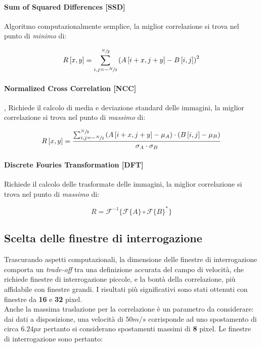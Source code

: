 \documentclass[a4paper]{article}
\begin{document}
\paragraph{Sum of Squared Differences [SSD]} Algoritmo computazionalmente semplice, la miglior correlazione si trova nel punto di \textit{minimo} di:

\begin{equation}
R\left[x,y \right] = \sum_{i,j=-\sfrac{N}{2}}^{\sfrac{N}{2}} \left( A\left[i+x,j+y\right] - B\left[i,j \right] \right)^2
\label{eq:ssd}
\end{equation}

\paragraph{Normalized Cross Correlation [NCC]}\cite{imcorr},\cite{ncc}  Richiede il calcolo di media e deviazione standard delle immagini, la miglior correlazione si trova nel punto di \textit{massimo} di:

\begin{equation}
R\left[x,y \right] = \frac{ \sum_{i,j=-\sfrac{N}{2}}^{\sfrac{N}{2}} \left( A\left[i+x,j+y\right] - \mu_A \right) \cdot \left( B\left[i,j \right] - \mu_B \right) } { \sigma_A \cdot \sigma_B }
\label{eq:ncc}
\end{equation}


\paragraph{Discrete Fouries Transformation [DFT]} Richiede il calcolo delle trasformate delle immagini, la miglior correlazione si trova nel punto di \textit{massimo} di:

\begin{equation}
R = \mathscr{F}^{-1} \{ \mathscr{F}\{A\} \circ \mathscr{F}\{B\}^*    \}
\label{eq:dft}
\end{equation}

\subsection{Scelta delle finestre di interrogazione}

Trascurando aspetti computazionali, la dimensione delle finestre di interrogazione comporta un \textit{trade-off} tra una definizione accurata del campo di velocità, che richiede finestre di interrogazione piccole, e la bontà della correlazione, più affidabile con finestre grandi. I risultati più significativi sono stati ottenuti con finestre da \textbf{16} e \textbf{32} pixel.\\
Anche la massima traslazione per la correlazione è un parametro da considerare: dai dati a disposizione, una velocità di $50 m/s$ corrisponde ad uno spostamento di circa $6.24px$ pertanto si considerano spostamenti massimi di \textbf{8} pixel. Le finestre di interrogazione sono pertanto:
\end{document}

